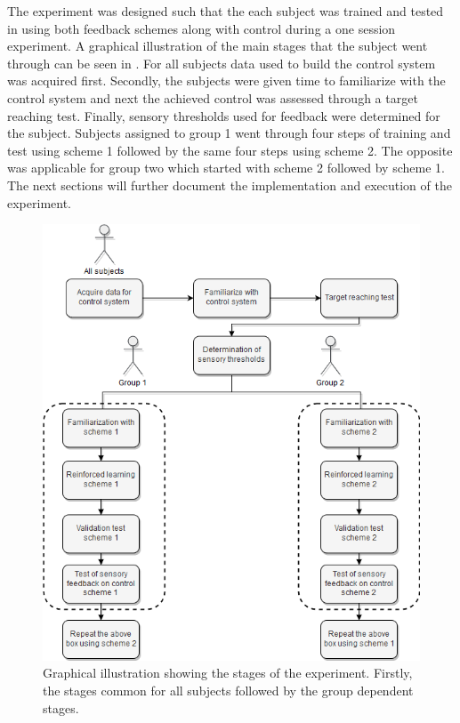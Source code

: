 The experiment was designed such that the each subject was trained and tested in using both feedback schemes along with control during a one session experiment. A graphical illustration of the main stages that the subject went through can be seen in . For all subjects data used to build the control system was acquired first. Secondly, the subjects were given time to familiarize with the control system and next the achieved control was assessed through a target reaching test. Finally, sensory thresholds used for feedback were determined for the subject. Subjects assigned to group 1 went through four steps of training and test using scheme 1 followed by the same four steps using scheme 2. The opposite was applicable for group two which started with scheme 2 followed by scheme 1. The next sections will further document the implementation and execution of the experiment.     


\begin{figure}[H]                 
	\includegraphics[width=.59\textwidth]{figures/std_design}
	\caption{Graphical illustration showing the stages of the experiment. Firstly, the stages common for all subjects followed by the group dependent stages.}
	\label{fig:std} 
\end{figure}